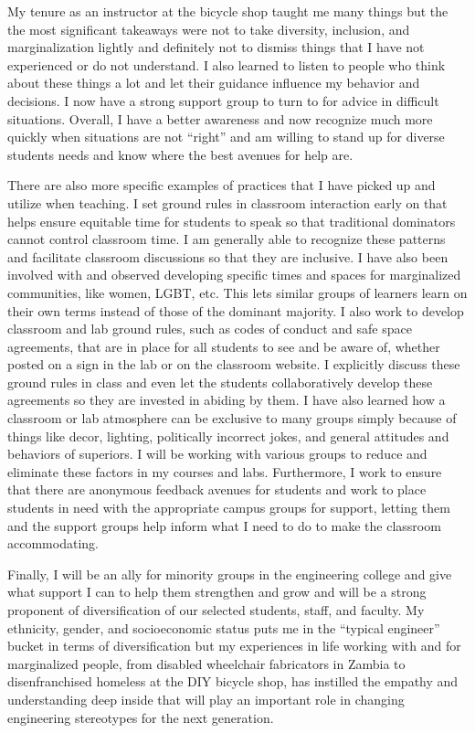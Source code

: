 \documentclass[titlepage]{article}
\begin{document}
My tenure as an instructor at the bicycle shop taught me many things but the
the most significant takeaways were not to take diversity, inclusion, and
marginalization lightly and definitely not to dismiss things that I have not
experienced or do not understand. I also learned to listen to people who think
about these things a lot and let their guidance influence my behavior and
decisions. I now have a strong support group to turn to for advice in difficult
situations. Overall, I have a better awareness and now recognize much more
quickly when situations are not ``right'' and am willing to stand up for
diverse students needs and know where the best avenues for help are.

There are also more specific examples of practices that I have picked up and
utilize when teaching. I set ground rules in classroom interaction early on
that helps ensure equitable time for students to speak so that traditional
dominators cannot control classroom time. I am generally able to recognize
these patterns and facilitate classroom discussions so that they are inclusive.
I have also been involved with and observed developing specific times and
spaces for marginalized communities, like women, LGBT, etc. This lets similar
groups of learners learn on their own terms instead of those of the dominant
majority. I also work to develop classroom and lab ground rules, such as codes
of conduct and safe space agreements, that are in place for all students to see
and be aware of, whether posted on a sign in the lab or on the classroom
website. I explicitly discuss these ground rules in class and even let the
students collaboratively develop these agreements so they are invested in
abiding by them. I have also learned how a classroom or lab atmosphere can be
exclusive to many groups simply because of things like decor, lighting,
politically incorrect jokes, and general attitudes and behaviors of superiors.
I will be working with various groups to reduce and eliminate these factors in
my courses and labs. Furthermore, I work to ensure that there are anonymous
feedback avenues for students and work to place students in need with the
appropriate campus groups for support, letting them and the support groups help
inform what I need to do to make the classroom accommodating.

Finally, I will be an ally for minority groups in the engineering college and
give what support I can to help them strengthen and grow and will be a strong
proponent of diversification of our selected students, staff, and faculty. My
ethnicity, gender, and socioeconomic status puts me in the ``typical engineer''
bucket in terms of diversification but my experiences in life working with and
for marginalized people, from disabled wheelchair fabricators in Zambia to
disenfranchised homeless at the DIY bicycle shop, has instilled the empathy and
understanding deep inside that will play an important role in changing
engineering stereotypes for the next generation.
\end{document}
